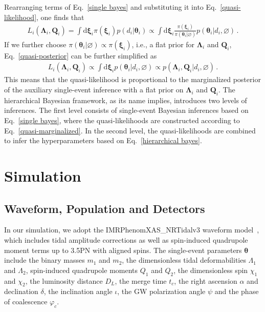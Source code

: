 \documentclass[a4paper,11pt]{article}
\begin{document}
Rearranging terms of Eq.~\eqref{single bayes} and substituting it into
Eq.~\eqref{quasi-likelihood}, one finds that
\begin{equation}
\label{quasi-posterior}
\begin{aligned}
    L_i(\bm{\Lambda}_i,\bm{Q}_i) = \int \text{d}\bm{\xi}_i \pi(\bm{\xi}_i)p(d_i|\bm{\theta}_i) \propto \int \text{d}\bm{\xi}_i \frac{\pi(\bm{\xi}_i)}{\pi(\bm{\theta}_i|\varnothing)}p(\bm{\theta}_i|d_i,\varnothing)\,.
\end{aligned}  
\end{equation}
If we further choose $\pi(\bm{\theta}_i|\varnothing)\propto\pi(\bm{\xi}_i)$, 
i.e., a flat prior for $\bm{\Lambda}_i$ and $\bm{Q}_i$, Eq.~\eqref{quasi-posterior} can be further simplified as 
\begin{equation}
\label{quasi-marginalized}
\begin{aligned}
    L_i(\bm{\Lambda}_i,\bm{Q}_i) \propto \int \text{d}\bm{\xi}_i p(\bm{\theta}_i|d_i,\varnothing)\propto p(\bm{\Lambda}_i,\bm{Q}_i|d_i,\varnothing)\,.
\end{aligned}  
\end{equation}
This means that the quasi-likelihood is proportional to the marginalized
posterior of the auxiliary single-event inference with a flat prior on
$\bm{\Lambda}_i$ and $\bm{Q}_i$. The
hierarchical Bayesian framework, as its name implies, introduces two levels of 
inferences. The first level 
consists of single-event Bayesian inferences based on Eq.~\eqref{single bayes},
where the quasi-likelihoods are constructed according to
Eq.~\eqref{quasi-marginalized}. In the second level, the quasi-likelihoods are
combined to infer the hyperparameters based on Eq.~\eqref{hierarchical bayes}.


\section{Simulation}
\label{sec:simulation}

\subsection{Waveform, Population and Detectors}
\label{subsec:simulation_preliminaries}

In our simulation, we adopt the {\sc IMRPhenomXAS\_NRTidalv3} waveform model~\cite{Abac:2023ujg}, 
which includes tidal amplitude corrections as well as spin-induced quadrupole
moment terms up to 3.5PN with aligned spins.
The single-event parameters $\bm{\theta}$ include 
 the binary masses $m_1$ and $m_2$, the 
dimensionless tidal deformabilities $\Lambda_1$ and $\Lambda_2$, spin-induced 
quadrupole moments $Q_1$ and $Q_2$, the dimensionless spin $\chi_1$ and $\chi_2$, the 
luminosity distance $D_L$, the merge time $t_{c}$, the right ascension $\alpha$ and 
declination $\delta$, the inclination angle $\iota$, the GW polarization angle 
$\psi$ and the phase of coalescence $\varphi_{c}$.
\end{document}
